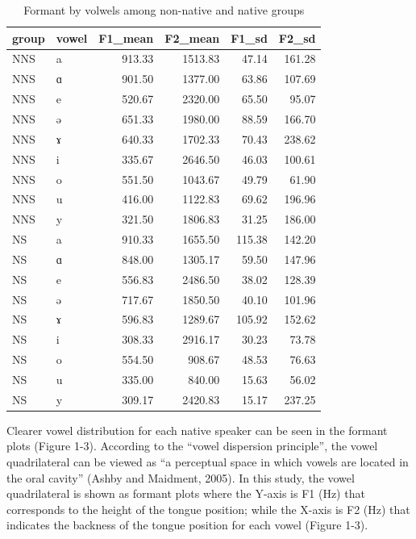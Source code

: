 \documentclass[man, fleqn, noextraspace]{apa6}
\begin{document}
\begin{table}

\caption{\label{tab:table1}Formant by volwels among non-native and native groups}
\centering
\begin{tabular}[t]{llrrrr}
\toprule
group & vowel & F1\_mean & F2\_mean & F1\_sd & F2\_sd\\
\midrule
NNS & a & 913.33 & 1513.83 & 47.14 & 161.28\\
NNS & ɑ & 901.50 & 1377.00 & 63.86 & 107.69\\
NNS & e & 520.67 & 2320.00 & 65.50 & 95.07\\
NNS & ə & 651.33 & 1980.00 & 88.59 & 166.70\\
NNS & ɤ & 640.33 & 1702.33 & 70.43 & 238.62\\
\addlinespace
NNS & i & 335.67 & 2646.50 & 46.03 & 100.61\\
NNS & o & 551.50 & 1043.67 & 49.79 & 61.90\\
NNS & u & 416.00 & 1122.83 & 69.62 & 196.96\\
NNS & y & 321.50 & 1806.83 & 31.25 & 186.00\\
NS & a & 910.33 & 1655.50 & 115.38 & 142.20\\
\addlinespace
NS & ɑ & 848.00 & 1305.17 & 59.50 & 147.96\\
NS & e & 556.83 & 2486.50 & 38.02 & 128.39\\
NS & ə & 717.67 & 1850.50 & 40.10 & 101.96\\
NS & ɤ & 596.83 & 1289.67 & 105.92 & 152.62\\
NS & i & 308.33 & 2916.17 & 30.23 & 73.78\\
\addlinespace
NS & o & 554.50 & 908.67 & 48.53 & 76.63\\
NS & u & 335.00 & 840.00 & 15.63 & 56.02\\
NS & y & 309.17 & 2420.83 & 15.17 & 237.25\\
\bottomrule
\end{tabular}
\end{table}

Clearer vowel distribution for each native speaker can be seen in the
formant plots (Figure 1-3). According to the ``vowel dispersion
principle'', the vowel quadrilateral can be viewed as ``a perceptual
space in which vowels are located in the oral cavity'' (Ashby and
Maidment, 2005). In this study, the vowel quadrilateral is shown as
formant plots where the Y-axis is F1 (Hz) that corresponds to the height
of the tongue position; while the X-axis is F2 (Hz) that indicates the
backness of the tongue position for each vowel (Figure 1-3).
\end{document}
